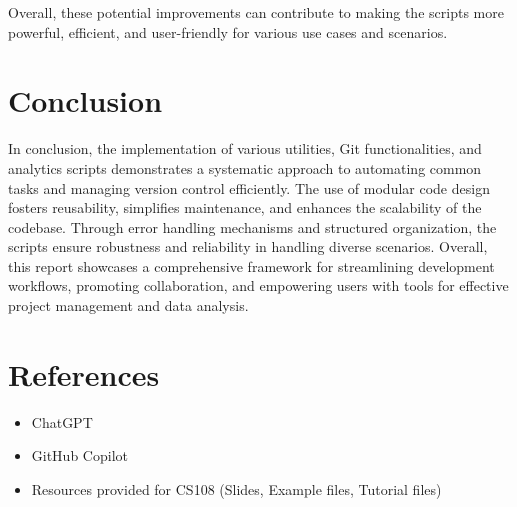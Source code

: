 \documentclass{article}
\begin{document}
Overall, these potential improvements can contribute to making the scripts more powerful, efficient, and user-friendly for various use cases and scenarios.

\section{Conclusion}
In conclusion, the implementation of various utilities, Git functionalities, and analytics scripts demonstrates a systematic approach to automating common tasks and managing version control efficiently. The use of modular code design fosters reusability, simplifies maintenance, and enhances the scalability of the codebase. Through error handling mechanisms and structured organization, the scripts ensure robustness and reliability in handling diverse scenarios. Overall, this report showcases a comprehensive framework for streamlining development workflows, promoting collaboration, and empowering users with tools for effective project management and data analysis.


\section{References}
\begin{itemize}
    \item ChatGPT
    \item GitHub Copilot
    \item Resources provided for CS108 (Slides, Example files, Tutorial files)
\end{itemize}
\end{document}

